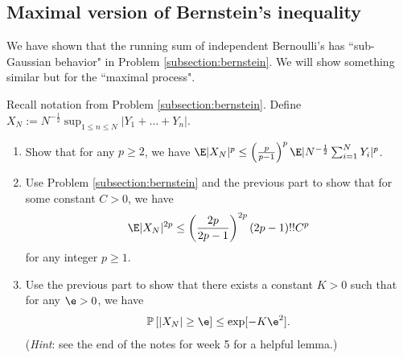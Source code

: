 \documentclass[12pt,reqno]{amsart}
\theoremstyle{definition}
\theoremstyle{remark}
\numberwithin{equation}{section}
\begin{document}
\subsection{Maximal version of Bernstein's inequality}
We have shown that the running sum of independent Bernoulli's has ``sub-Gaussian behavior" in Problem \ref{subsection:bernstein}. We will show something similar but for the ``maximal process".

Recall notation from Problem \ref{subsection:bernstein}. Define $X_{N}:=N^{-\frac12}\sup_{1\leq n\leq N}|Y_{1}+\ldots+Y_{n}|$.
\begin{enumerate}
\item Show that for any $p\geq2$, we have $\E|X_{N}|^{p}\leq\left(\frac{p}{p-1}\right)^{p}\E|N^{-\frac12}\sum_{i=1}^{N}Y_{i}|^{p}$.
\item Use Problem \ref{subsection:bernstein} and the previous part to show that for some constant $C>0$, we have 
%
\begin{align*}
\E|X_{N}|^{2p}\leq\left(\frac{2p}{2p-1}\right)^{2p}(2p-1)!!C^{p}
\end{align*}
%
for any integer $p\geq1$.
\item Use the previous part to show that there exists a constant $K>0$ such that for any $\e>0$, we have
%
\begin{align*}
\mathbb{P}\left[|X_{N}|\geq \e\right]\leq\exp[-K\e^{2}].
\end{align*}
%
{\color{red}(\emph{Hint}: see the end of the notes for week 5 for a helpful lemma.)}
\end{enumerate}
\end{document}
